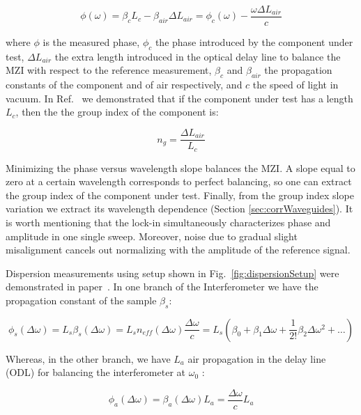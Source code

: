 \begin{equation}
  \phi(\omega)= \beta_c L_c - \beta_{air} \Delta L_{air} =\phi_{c}(\omega)-\frac{\omega\Delta L_{air}}{c}
  \label{eq:response}
\end{equation}

where $\phi$ is the measured phase, $\phi_{c}$ the phase introduced by the component under test, $\Delta L_{air}$ the extra length introduced in the optical delay line to balance the MZI with respect to the reference measurement, $\beta_c$ and $\beta_{air}$ the propagation constants of the component and of air respectively, and $c$ the speed of light in vacuum.
In Ref.~\cite{Mas2012} we demonstrated that if the component under test has a length $L_{c}$, then the the group index of the component is:

\begin{equation}
  n_{g} = \frac{\Delta L_{air}}{L_{c}}
  \label{eq:group_index_pathBalancing}
\end{equation}

Minimizing the phase versus wavelength slope balances the MZI.
A slope equal to zero at a certain wavelength corresponds to perfect balancing, so one can extract the group index of the component under test.
Finally, from the group index slope variation we extract its wavelength dependence (Section \ref{sec:corrWaveguides}).
It is worth mentioning that the lock-in simultaneously characterizes phase and amplitude in one single sweep.
Moreover, noise due to gradual slight misalignment cancels out normalizing with the amplitude of the reference signal.

Dispersion measurements using setup shown in Fig.~\ref{fig:dispersionSetup} were demonstrated in paper~\cite{Mas2012}.
In one branch of the Interferometer we have the propagation constant of the sample $\beta_s$:

\begin{equation}
	\phi_{s}(\Delta \omega)=  L_{s} \beta_{s}(\Delta \omega)  = L_{s} n_{eff}(\Delta \omega)\frac{\Delta \omega}{c} = L_{s} (\beta_0+\beta_1\Delta \omega+\frac{1}{2!}\beta_2\Delta \omega^2 + \ldots)
\end{equation}

Whereas, in the other branch, we have $L_a$ air propagation in the delay line (ODL) for balancing the interferometer at $\omega_0$ :

\begin{equation}
	\phi_{a}(\Delta \omega)=  \beta_{a}(\Delta \omega) L_{a} =\frac{\Delta \omega}{c} L_{a} 
\end{equation}


